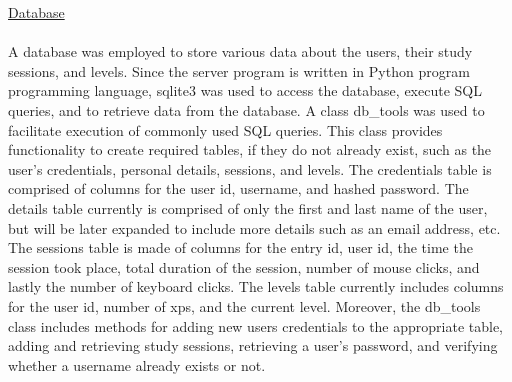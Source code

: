 \documentclass[12pt]{article}
\begin{document}
\noindent \underline{Database} \\
\\\indent A database was employed to store various data about the users, their study sessions, and levels. Since the server program is written in Python program programming language, sqlite3 was used to access the database, execute SQL queries, and to retrieve data from the database. A class db\_tools was used to facilitate execution of commonly used SQL queries. This class provides functionality to create required tables, if they do not already exist, such as the user's credentials, personal details, sessions, and levels. The credentials table is comprised of columns for the user id, username, and hashed password. The details table currently is comprised of only the first and last name of the user, but will be later expanded to include more details such as an email address, etc. The sessions table is made of columns for the entry id, user id, the time the session took place, total duration of the session, number of mouse clicks, and lastly the number of keyboard clicks. The levels table currently includes columns for the user id, number of xps, and the current level.  Moreover, the db\_tools class includes methods for adding new users credentials to the appropriate table, adding and retrieving study sessions, retrieving a user's password, and verifying whether a username already exists or not. \\\\
\end{document}
